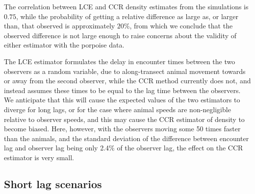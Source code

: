 \documentclass[useAMS, usenatbib, referee]{biom}\usepackage[]{graphicx}\usepackage[]{color}
\begin{document}
The correlation between LCE and CCR density estimates from the simulations is $0.75$, while the probability of getting a relative difference as large as, or larger than, that observed is approximately $20$\%, from which we conclude that the observed difference is not large enough to raise concerns about the validity of either estimator with the porpoise data.



The LCE estimator formulates the delay in encounter times between the two observers as a random variable, due to along-transect animal movement towards or away from the second observer, while the CCR method currently does not, and instead assumes these times to be equal to the lag time between the observers. We anticipate that this will cause the expected values of the two estimators to diverge for long lags, or for the case where animal speeds are non-negligible relative to observer speeds, and this may cause the CCR estimator of density to become biased. Here, however, with the observers moving some 50 times faster than the animals, and the standard deviation of the difference between encounter lag and observer lag being only 2.4\% of the observer lag, the effect on the CCR estimator is very small.

\subsection{Short lag scenarios}

\end{document}
